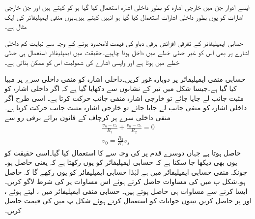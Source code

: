 ایسے ادوار جن میں خارجی اشارہ کو بطور داخلی اشارہ استعمال کیا گیا ہو کو  کہتے ہیں اور جن خارجی  اشارات کو یوں بطور داخلی اشارات استعمال کیا گیا ہو انہیں   کہتے ہیں۔یوں منفی ایمپلیفائر  کی ایک مثال ہے۔

حسابی ایمپلیفائر کے تفرقی افزائش برقی دباو   کی قیمت لامحدود ہونے کے وجہ سے نہایت کم داخلی اشارے پر بھی اس کو غیر خطی خطے میں داخل ہونا چاہیے۔حقیقت میں ایمپلیفائر استعمال ہی خطی خطے میں ہوتا ہے اور واپسی اشارے کی شمولیت اس کو ممکن بناتی ہے۔

حسابی منفی ایمپلیفائر پر دوبارہ غور کریں۔داخلی اشارہ  کو منفی داخلی سرے پر مہیا کیا گیا ہے۔جیسا شکل میں تیر کے نشانوں سے دکھایا گیا ہے کہ اگر داخلی اشارہ  کو مثبت جانب  لے جایا جائے تو خارجی اشارہ  منفی جانب  حرکت کرتا ہے۔ اسی طرح اگر داخلی اشارہ  کو منفی جانب  لے جایا جائے تو خارجی اشارہ  مثبت جانب  حرکت کرتا ہے۔منفی داخلی سرے  پر کرچاف کے قانون برائے برقی رو سے 
\begin{align}\label{مساوات_حسابی_واپسی_منفی}
\frac{v_n-v_s}{R_1}+\frac{v_n-v_o}{R_2}=0\\
v_0=\frac{R_2}{R_1} v_s
\end{align}
حاصل ہوتا ہے جہاں  دوسرے قدم پر  کی وجہ سے  کا استعمال کیا گیا۔اسی حقیقت کو یوں بھی دیکھا جا سکتا ہے کہ حسابی ایمپلیفائر  کو یوں رکھتا ہے کہ  یعنی   حاصل ہو۔چونکہ منفی حسابی ایمپلیفائر میں  ہے لہٰذا حسابی ایمپلیفائر  کو یوں رکھے گا کہ  حاصل ہو۔شکل  پ میں  کی مساوات حاصل کرتے ہوئے  اس مساوات پر  کی شرط لاگو کریں۔ایسا کرنے سے مساوات  ہی حاصل ہوتے ہیں۔
حسابی منفی ایمپلیفائر میں ،  لیتے ہوئے ،   اور   پر  حاصل کریں۔تینوں جوابات کو استعمال کرتے ہوئے شکل  پ میں  کی قیمت حاصل کریں۔

